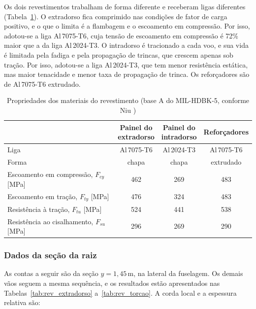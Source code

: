Os dois revestimentos trabalham de forma diferente e receberam ligas diferentes (Tabela~\ref{tab:rev_materiais}). O extradorso fica comprimido nas condições de fator de carga positivo, e o que o limita é a flambagem e o escoamento em compressão. Por isso, adotou-se a liga Al\,7075-T6, cuja tensão de escoamento em compressão é 72\% maior que a da liga Al\,2024-T3. O intradorso é tracionado a cada voo, e sua vida é limitada pela fadiga e pela propagação de trincas, que crescem apenas sob tração. Por isso, adotou-se a liga Al\,2024-T3, que tem menor resistência estática, mas maior tenacidade e menor taxa de propagação de trinca. Os reforçadores são de Al\,7075-T6 extrudado.
 
\begin{table}[H]
\centering
\caption{Propriedades dos materiais do revestimento (base A do MIL-HDBK-5, conforme Niu \cite{niu1999})}
\label{tab:rev_materiais}
\small
\begin{tabular}{lccc}
\toprule
 & \makecell{\textbf{Painel do}\\\textbf{extradorso}} & \makecell{\textbf{Painel do}\\\textbf{intradorso}} & \textbf{Reforçadores} \\
\midrule
Liga                                                    & Al\,7075-T6 & Al\,2024-T3 & Al\,7075-T6 \\
Forma                                                   & chapa       & chapa       & extrudado   \\
Escoamento em compressão, $F_{cy}$ [MPa]                & 462         & 269         & 483         \\
Escoamento em tração, $F_{ty}$ [MPa]                    & 476         & 324         & 483         \\
Resistência à tração, $F_{tu}$ [MPa]                    & 524         & 441         & 538         \\
Resistência ao cisalhamento, $F_{su}$ [MPa]             & 296         & 269         & 290         \\
\bottomrule
\end{tabular}
\end{table}
 
\subsubsection{Dados da seção da raiz}
 
As contas a seguir são da seção $y = 1{,}45$\,m, na lateral da fuselagem. Os demais vãos seguem a mesma sequência, e os resultados estão apresentados nas Tabelas~\ref{tab:rev_extradorso} a~\ref{tab:rev_torcao}. A corda local e a espessura relativa são:
 
